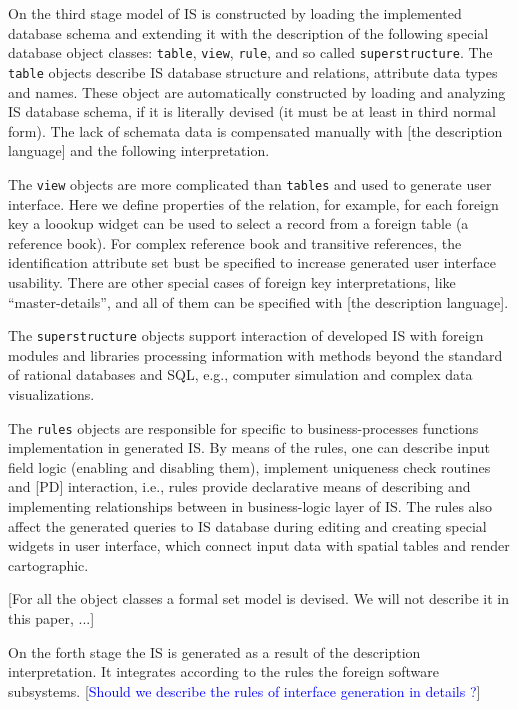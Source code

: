 \documentclass[conference]{IEEEtran}
\newcommand{\e}[2][fcolor]{\textcolor{pcolor}{[}\textcolor{#1}{#2}\textcolor{pcolor}{]}}
\begin{document}
On the third stage model of IS is constructed by loading the implemented database schema and extending it with the description of the following special database object classes: \texttt{table}, \texttt{view}, \texttt{rule}, and so called \texttt{superstructure}.  The \texttt{table} objects describe IS database structure and relations, attribute data types and names.  These object are automatically constructed by loading and analyzing IS database schema, if it is literally devised (it must be at least in third normal form).  The lack of schemata data is compensated manually with \e{the description language} and the following interpretation.

The \texttt{view} objects are more complicated than \texttt{tables} and used to generate user interface.  Here we define properties of the relation, for example, for each foreign key a loookup widget can be used to select a  record from a foreign table (a reference book).  For complex reference book and transitive references, the identification attribute set bust be specified to increase generated user interface usability.  There are other special cases of foreign key interpretations, like ``master-details'', and all of them can be specified with \e{the description language}.

The \texttt{superstructure} objects support interaction of developed IS with foreign modules and libraries processing information with methods beyond the standard of rational databases and SQL, e.g., computer simulation and complex data visualizations.

The \texttt{rules} objects are responsible for specific to business-processes functions implementation in generated IS.  By means of the rules, one can describe input field logic (enabling and disabling them), implement uniqueness check routines and \e{PD} interaction, i.e., rules provide declarative means of describing and implementing relationships between in business-logic layer of IS.  The rules also affect the generated queries to IS database during editing and creating special widgets in user interface, which connect input data with spatial tables and render cartographic.

\e{For all the object classes a formal set model is devised.  We will not describe it in this paper, ...}

On the forth stage the IS is generated as a result of the description interpretation.  It integrates according to the rules the foreign software subsystems. \e[blue]{Should we describe the rules of interface generation in details ?}
\end{document}
